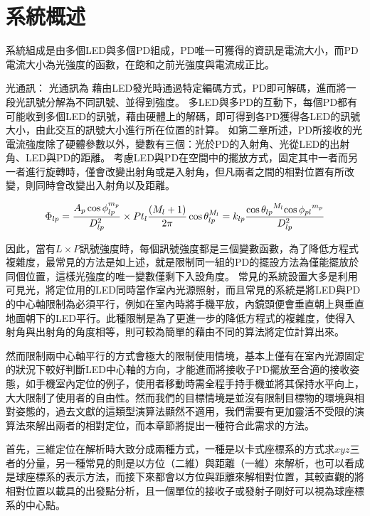 \section{系統概述}


系統組成是由多個LED與多個PD組成，PD唯一可獲得的資訊是電流大小，而PD電流大小為光強度的函數，在飽和之前光強度與電流成正比。

光通訊：
光通訊為
藉由LED發光時通過特定編碼方式，PD即可解碼，進而將一段光訊號分解為不同訊號、並得到強度。
多LED與多PD的互動下，每個PD都有可能收到多個LED的訊號，藉由硬體上的解碼，即可得到各PD獲得各LED的訊號大小，由此交互的訊號大小進行所在位置的計算。
如第二章所述，PD所接收的光電流強度除了硬體參數以外，變數有三個：光於PD的入射角、光從LED的出射角、LED與PD的距離。
考慮LED與PD在空間中的擺放方式，固定其中一者而另一者進行旋轉時，僅會改變出射角或是入射角，但凡兩者之間的相對位置有所改變，則同時會改變出入射角以及距離。

\begin{equation}
    \Phi_{lp}=\frac{ A_p\cos\phi_{lp}^{m_{p}} }{D^2_{lp}}\times Pt_l\frac{(M_{l}+1)}{2 \pi} \cos \theta_{lp}^{M_{l}}  \\
    =k_{lp}\frac{{\cos\theta_{lp}}^{M_{l}}{\cos\phi_{pl}}^{m_{p}}}{D_{lp}^2}\\
\end{equation}

因此，當有$L\times P$訊號強度時，每個訊號強度都是三個變數函數，為了降低方程式複雜度，最常見的方法是如上述，就是限制同一組的PD的擺設方法為僅能擺放於同個位置，這樣光強度的唯一變數僅剩下入設角度。
常見的系統設置大多是利用可見光，將定位用的LED同時當作室內光源照射，而且常見的系統是將LED與PD的中心軸限制為必須平行，例如在室內時將手機平放，內鏡頭便會垂直朝上與垂直地面朝下的LED平行。此種限制是為了更進一步的降低方程式的複雜度，使得入射角與出射角的角度相等，則可較為簡單的藉由不同的算法將定位計算出來。

然而限制兩中心軸平行的方式會極大的限制使用情境，基本上僅有在室內光源固定的狀況下較好判斷LED中心軸的方向，才能進而將接收子PD擺放至合適的接收姿態，如手機室內定位的例子，使用者移動時需全程手持手機並將其保持水平向上，大大限制了使用者的自由性。然而我們的目標情境是並沒有限制目標物的環境與相對姿態的，過去文獻的這類型演算法顯然不適用，我們需要有更加靈活不受限的演算法來解出兩者的相對定位，而本章節將提出一種符合此需求的方法。


首先，三維定位在解析時大致分成兩種方式，一種是以卡式座標系的方式求$xyz$三者的分量，另一種常見的則是以方位（二維）與距離（一維）來解析，也可以看成是球座標系的表示方法，而接下來都會以方位與距離來解相對位置，其較直觀的將相對位置以載具的出發點分析，且一個單位的接收子或發射子剛好可以視為球座標系的中心點。

